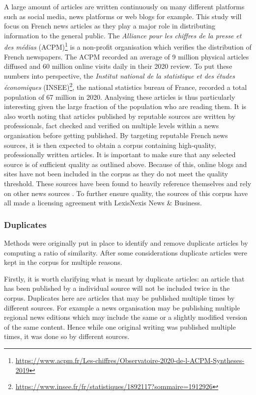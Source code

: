 A large amount of articles are written continuously on many different platforms such as social media, news platforms or web blogs for example. This study will focus on French news articles as they play a major role in distributing information to the general public. The \emph{Alliance pour les chiffres de la presse et des médias} (ACPM)\footnote{\url{https://www.acpm.fr/Les-chiffres/Observatoire-2020-de-l-ACPM-Syntheses-2019}} is a non-profit organisation which verifies the distribution of French newspapers. The ACPM recorded an average of 9 million physical articles diffused and 60 million online visits daily in their 2020 review. To put these numbers into perspective, the \emph{Institut national de la statistique et des études économiques} (INSEE)\footnote{\url{https://www.insee.fr/fr/statistiques/1892117?sommaire=1912926}}, the national statistics bureau of France, recorded a total population of 67 million in 2020. Analysing these articles is thus particularly interesting given the large fraction of the population who are reading them. It is also worth noting that articles published by reputable sources are written by professionals, fact checked and verified on multiple levels within a news organisation before getting published. By targeting reputable French news sources, it is then expected to obtain a corpus containing high-quality, professionally written articles. It is important to make sure that any selected source is of sufficient quality as outlined above. Because of this, online blogs and sites have not been included in the corpus as they do not meet the quality threshold. These sources have been found to heavily reference themselves and rely on other news sources \cite{adamic2005political}. To further ensure quality, the sources of this corpus have all made a licensing agreement with LexisNexis News \& Business.

\subsubsection{Duplicates}

Methods were originally put in place to identify and remove duplicate articles by computing a ratio of similarity. After some considerations duplicate articles were kept in the corpus for multiple reasons.

Firstly, it is worth clarifying what is meant by duplicate articles: an article that has been published by a individual source will not be included twice in the corpus. Duplicates here are articles that may be published multiple times by different sources. For example a news organisation may be publishing multiple regional news editions which may include the same or a slightly modified version of the same content. Hence while one original writing was published multiple times, it was done so by different sources.

